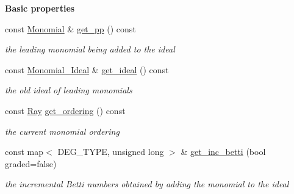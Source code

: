 \begin{Indent}\textbf{ Basic properties}\par
\begin{DoxyCompactItemize}
\item 
\mbox{\label{group___g_b_computation_a0b70c63442c37067103f9939b17ef4ec}} 
const \hyperlink{group__polygroup_class_monomial}{Monomial} \& \hyperlink{group___g_b_computation_a0b70c63442c37067103f9939b17ef4ec}{get\+\_\+pp} () const
\begin{DoxyCompactList}\small\item\em the leading monomial being added to the ideal \end{DoxyCompactList}\item 
\mbox{\label{group___g_b_computation_acb57c1467a4d6e622143057fde1ba1b6}} 
const \hyperlink{group__polygroup_class_monomial___ideal}{Monomial\+\_\+\+Ideal} \& \hyperlink{group___g_b_computation_acb57c1467a4d6e622143057fde1ba1b6}{get\+\_\+ideal} () const
\begin{DoxyCompactList}\small\item\em the old ideal of leading monomials \end{DoxyCompactList}\item 
\mbox{\label{group___g_b_computation_af63c24b930505b1a57914234d202417c}} 
const \hyperlink{group___c_l_s_solvers_class_l_p___solvers_1_1_ray}{Ray} \hyperlink{group___g_b_computation_af63c24b930505b1a57914234d202417c}{get\+\_\+ordering} () const
\begin{DoxyCompactList}\small\item\em the current monomial ordering \end{DoxyCompactList}\item 
\mbox{\label{group___g_b_computation_acc39727c4e1ef77c8fb74bca7955e9c4}} 
const map$<$ D\+E\+G\+\_\+\+T\+Y\+PE, unsigned long $>$ \& \hyperlink{group___g_b_computation_acc39727c4e1ef77c8fb74bca7955e9c4}{get\+\_\+inc\+\_\+betti} (bool graded=false)
\begin{DoxyCompactList}\small\item\em the incremental Betti numbers obtained by adding the monomial to the ideal \end{DoxyCompactList}\item 
\mbox{\label{group___g_b_computation_aaef635310e198cfa9f9da6fd50c4bc84}} 

\end{DoxyCompactItemize}
\end{Indent}
